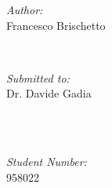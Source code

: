 \begin{titlepage}
	\begin{minipage}{0.4\textwidth}
		\begin{flushleft} \large
			\emph{Author:}\\
			Francesco Brischetto
		\end{flushleft}
	\end{minipage}
	~
	\begin{minipage}{0.4\textwidth}
		\begin{flushright} \large
			\emph{Submitted to:} \\
			Dr. Davide Gadia \\[1.2em] 
		\end{flushright}
	\end{minipage}\\[0.5cm]
	~
	\begin{minipage}{0.85\textwidth}
		\begin{flushleft} \large
			\emph{Student Number:}\\
			958022
		\end{flushleft}
	\end{minipage}
	\\[2cm]
	\makeatother
	
	
	{\large {}}\\[4cm] %
	
	\vfill %
	
\end{titlepage}